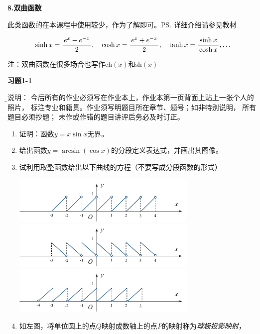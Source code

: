 {\bf 8.双曲函数}

此类函数的在本课程中使用较少，作为了解即可。\ps{详细介绍请参见教材}

$$\sinh x =\displaystyle\frac{\,{e^x-e^{-x}}\,}{\,{2}\,}, \quad
\cosh x =\displaystyle\frac{\,{e^x+e^{-x}}\,}{\,{2}\,}, \quad\tanh x=\displaystyle\frac{\,{\sinh
x}\,}{\,{\cosh x}\,}, \ldots$$

注：双曲函数在很多场合也写作$\mathrm{ch}(x)$和$\mathrm{sh}(x)$

\bigskip

\begin{ext}
	{\centering\bf 习题1-1}
	
	{\b\kaishu 说明：	今后所有的作业必须写在作业本上，作业本第一页背面上贴上一张个人的照片，
	标注专业和籍贯。作业须写明题目所在章节、题号；如非特别说明，	所有题目必须抄题；
	未作或作错的题目讲评后务必及时订正。}
	
	\begin{enumerate}  
	  \item 证明：函数$y=x\sin x$无界。
	  \item 给出函数$y=\arcsin(\cos x)$的分段定义表达式，并画出其图像。
	  \item 试利用取整函数给出以下曲线的方程（不要写成分段函数的形式）
	  \begin{center}
	  	\includegraphics[width=0.7\textwidth]{./images/Ch01/f1.pdf}\\
	  	\includegraphics[width=0.7\textwidth]{./images/Ch01/f2.pdf}\\
	  	\includegraphics[width=0.7\textwidth]{./images/Ch01/f3.pdf}
	  \end{center}
	  \item 如左图，将单位圆上的点$Q$映射成数轴上的点$P$的映射称为{\it 球极投影映射}，

\end{enumerate}
\end{ext}
